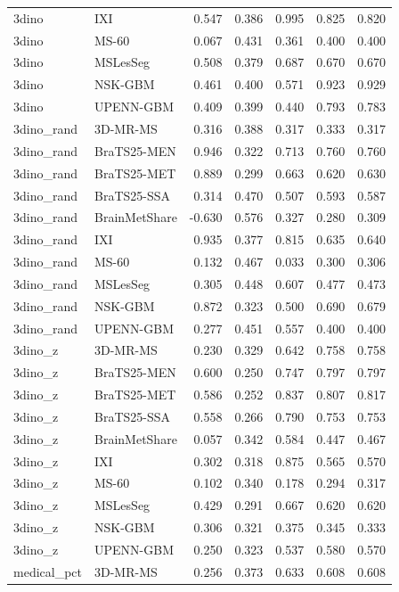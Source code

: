 \begin{tabular}{llrrrrr}
3dino & IXI & 0.547 & 0.386 & 0.995 & 0.825 & 0.820 \\
3dino & MS-60 & 0.067 & 0.431 & 0.361 & 0.400 & 0.400 \\
3dino & MSLesSeg & 0.508 & 0.379 & 0.687 & 0.670 & 0.670 \\
3dino & NSK-GBM & 0.461 & 0.400 & 0.571 & 0.923 & 0.929 \\
3dino & UPENN-GBM & 0.409 & 0.399 & 0.440 & 0.793 & 0.783 \\
3dino\_rand & 3D-MR-MS & 0.316 & 0.388 & 0.317 & 0.333 & 0.317 \\
3dino\_rand & BraTS25-MEN & 0.946 & 0.322 & 0.713 & 0.760 & 0.760 \\
3dino\_rand & BraTS25-MET & 0.889 & 0.299 & 0.663 & 0.620 & 0.630 \\
3dino\_rand & BraTS25-SSA & 0.314 & 0.470 & 0.507 & 0.593 & 0.587 \\
3dino\_rand & BrainMetShare & -0.630 & 0.576 & 0.327 & 0.280 & 0.309 \\
3dino\_rand & IXI & 0.935 & 0.377 & 0.815 & 0.635 & 0.640 \\
3dino\_rand & MS-60 & 0.132 & 0.467 & 0.033 & 0.300 & 0.306 \\
3dino\_rand & MSLesSeg & 0.305 & 0.448 & 0.607 & 0.477 & 0.473 \\
3dino\_rand & NSK-GBM & 0.872 & 0.323 & 0.500 & 0.690 & 0.679 \\
3dino\_rand & UPENN-GBM & 0.277 & 0.451 & 0.557 & 0.400 & 0.400 \\
3dino\_z & 3D-MR-MS & 0.230 & 0.329 & 0.642 & 0.758 & 0.758 \\
3dino\_z & BraTS25-MEN & 0.600 & 0.250 & 0.747 & 0.797 & 0.797 \\
3dino\_z & BraTS25-MET & 0.586 & 0.252 & 0.837 & 0.807 & 0.817 \\
3dino\_z & BraTS25-SSA & 0.558 & 0.266 & 0.790 & 0.753 & 0.753 \\
3dino\_z & BrainMetShare & 0.057 & 0.342 & 0.584 & 0.447 & 0.467 \\
3dino\_z & IXI & 0.302 & 0.318 & 0.875 & 0.565 & 0.570 \\
3dino\_z & MS-60 & 0.102 & 0.340 & 0.178 & 0.294 & 0.317 \\
3dino\_z & MSLesSeg & 0.429 & 0.291 & 0.667 & 0.620 & 0.620 \\
3dino\_z & NSK-GBM & 0.306 & 0.321 & 0.375 & 0.345 & 0.333 \\
3dino\_z & UPENN-GBM & 0.250 & 0.323 & 0.537 & 0.580 & 0.570 \\
medical\_pct & 3D-MR-MS & 0.256 & 0.373 & 0.633 & 0.608 & 0.608 \\

\end{tabular}
